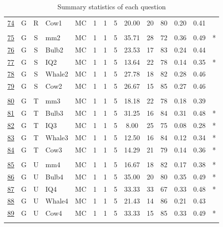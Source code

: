 \documentclass[12pt,nohyper]{tufte-handout}\usepackage[]{graphicx}\usepackage[]{color}
\begin{document}
\begin{longtable}{cccl|cccc|ccccc|l}
  \hyperlink{T06.G.R.05.1.1.MC.Cow1.2}{74} & G & R & Cow1 & MC &   1 &   1 &   5 & 20.00 &  20 &  80 & 0.20 & 0.41 &  \\ 
   &  &  &  &  &  &  &  &  &  &  &  &  &  \\ 
  \hyperlink{T06.G.S.05.1.1.MC.mm2.2}{75} & G & S & mm2 & MC &   1 &   1 &   5 & 35.71 &  28 &  72 & 0.36 & 0.49 & * \\ 
  \hyperlink{T06.G.S.05.1.1.MC.Bulb2.2}{76} & G & S & Bulb2 & MC &   1 &   1 &   5 & 23.53 &  17 &  83 & 0.24 & 0.44 &  \\ 
  \hyperlink{T06.G.S.05.1.1.MC.IQ2.2}{77} & G & S & IQ2 & MC &   1 &   1 &   5 & 13.64 &  22 &  78 & 0.14 & 0.35 & * \\ 
  \hyperlink{T06.G.S.05.1.1.MC.Whale2.2}{78} & G & S & Whale2 & MC &   1 &   1 &   5 & 27.78 &  18 &  82 & 0.28 & 0.46 &  \\ 
  \hyperlink{T06.G.S.05.1.1.MC.Cow2.2}{79} & G & S & Cow2 & MC &   1 &   1 &   5 & 26.67 &  15 &  85 & 0.27 & 0.46 &  \\ 
   &  &  &  &  &  &  &  &  &  &  &  &  &  \\ 
  \hyperlink{T06.G.T.05.1.1.MC.mm3.2}{80} & G & T & mm3 & MC &   1 &   1 &   5 & 18.18 &  22 &  78 & 0.18 & 0.39 &  \\ 
  \hyperlink{T06.G.T.05.1.1.MC.Bulb3.2}{81} & G & T & Bulb3 & MC &   1 &   1 &   5 & 31.25 &  16 &  84 & 0.31 & 0.48 & * \\ 
  \hyperlink{T06.G.T.05.1.1.MC.IQ3.2}{82} & G & T & IQ3 & MC &   1 &   1 &   5 & 8.00 &  25 &  75 & 0.08 & 0.28 & * \\ 
  \hyperlink{T06.G.T.05.1.1.MC.Whale3.2}{83} & G & T & Whale3 & MC &   1 &   1 &   5 & 12.50 &  16 &  84 & 0.12 & 0.34 & * \\ 
  \hyperlink{T06.G.T.05.1.1.MC.Cow3.2}{84} & G & T & Cow3 & MC &   1 &   1 &   5 & 14.29 &  21 &  79 & 0.14 & 0.36 & * \\ 
   &  &  &  &  &  &  &  &  &  &  &  &  &  \\ 
  \hyperlink{T06.G.U.05.1.1.MC.mm4.2}{85} & G & U & mm4 & MC &   1 &   1 &   5 & 16.67 &  18 &  82 & 0.17 & 0.38 & * \\ 
  \hyperlink{T06.G.U.05.1.1.MC.Bulb4.2}{86} & G & U & Bulb4 & MC &   1 &   1 &   5 & 35.00 &  20 &  80 & 0.35 & 0.49 & * \\ 
  \hyperlink{T06.G.U.05.1.1.MC.IQ4.2}{87} & G & U & IQ4 & MC &   1 &   1 &   5 & 33.33 &  33 &  67 & 0.33 & 0.48 & * \\ 
  \hyperlink{T06.G.U.05.1.1.MC.Whale4.2}{88} & G & U & Whale4 & MC &   1 &   1 &   5 & 21.43 &  14 &  86 & 0.21 & 0.43 &  \\ 
  \hyperlink{T06.G.U.05.1.1.MC.Cow4.2}{89} & G & U & Cow4 & MC &   1 &   1 &   5 & 33.33 &  15 &  85 & 0.33 & 0.49 & * \\ 
   \hline
\hline
\caption{Summary statistics of each question} 
\label{tab:summary_question}
\end{longtable}
\end{document}
